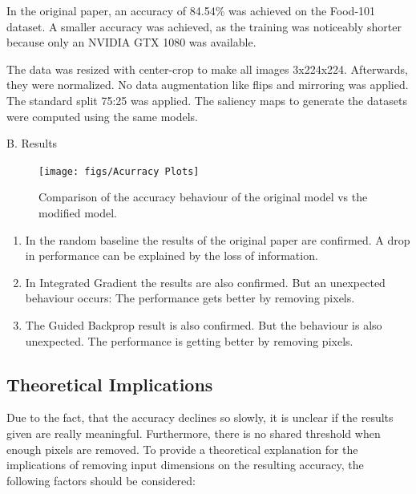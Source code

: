In the original paper, an accuracy of 84.54\% was achieved on the Food-101 dataset. A smaller accuracy was achieved, as the training was noticeably shorter because only an NVIDIA GTX 1080 was available.

The data was resized with center-crop to make all images 3x224x224. Afterwards, they were normalized. No data augmentation like flips and mirroring was applied. The standard split 75:25 was applied. The saliency maps to generate the datasets were computed using the same models.

B. Results

\begin{figure}[h!]
	\centering
	\texttt{[image: figs/Acurracy Plots]}
	\caption {Comparison of the accuracy behaviour of the original model vs the modified model.}
	\label{fig:Sanity}
\end{figure}

\begin{enumerate}
	\item In the random baseline the results of the original paper are confirmed. A drop in performance can be explained by the loss of information.
	\item In Integrated Gradient the results are also confirmed. But an unexpected behaviour occurs: The performance gets better by removing pixels. 
	\item The Guided Backprop result is also confirmed. But the behaviour is also unexpected. The performance is getting better by removing pixels.
\end{enumerate}



\subsection{Theoretical Implications}

Due to the fact, that the accuracy declines so slowly, it is unclear if the results given are really meaningful. Furthermore, there is no shared threshold when enough pixels are removed.
To provide a theoretical explanation for the implications of removing input dimensions on the resulting accuracy, the following factors should be considered:

